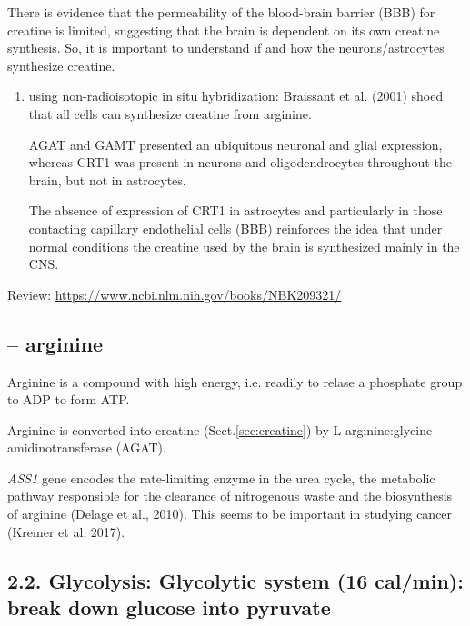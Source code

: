 There is evidence that the permeability of the blood-brain barrier (BBB) for
creatine is limited, suggesting that the brain is dependent on its own creatine
synthesis. So, it is important to understand if and how the  neurons/astrocytes
synthesize creatine.
\begin{enumerate}
  \item using  non-radioisotopic in situ hybridization: Braissant et al. (2001)
  shoed that all cells can synthesize creatine from arginine.

  AGAT and GAMT presented an ubiquitous neuronal and glial expression, whereas
  CRT1 was present in neurons and oligodendrocytes throughout the brain, but not
  in astrocytes.

The absence of expression of CRT1 in astrocytes and particularly in those
contacting capillary endothelial cells (BBB) reinforces the idea that under
normal conditions the creatine used by the brain is synthesized mainly in the
CNS.

\end{enumerate}




Review: \url{https://www.ncbi.nlm.nih.gov/books/NBK209321/}



\subsection{-- arginine}
\label{sec:arginine}

Arginine is a compound with high energy, i.e. readily to relase a phosphate
group to ADP to form ATP.

Arginine is converted into creatine (Sect.\ref{sec:creatine})
by L-arginine:glycine amidinotransferase (AGAT).

{\it ASS1} gene encodes the rate-limiting enzyme in the urea cycle, the
metabolic pathway responsible for the clearance of nitrogenous waste and the
biosynthesis of arginine (Delage et al., 2010). This seems to be important in
studying cancer (Kremer et al. 2017).


\subsection{2.2. Glycolysis: Glycolytic system (16 cal/min): break down glucose
into pyruvate}
\label{sec:glycolytic-system}
\label{sec:glycolysis}
\label{sec:glycolysis-anaerobic}
\label{sec:anaerobic-glycolysis}
\label{sec:ATP-production-in-cytosol-via-glycolytic-system}

